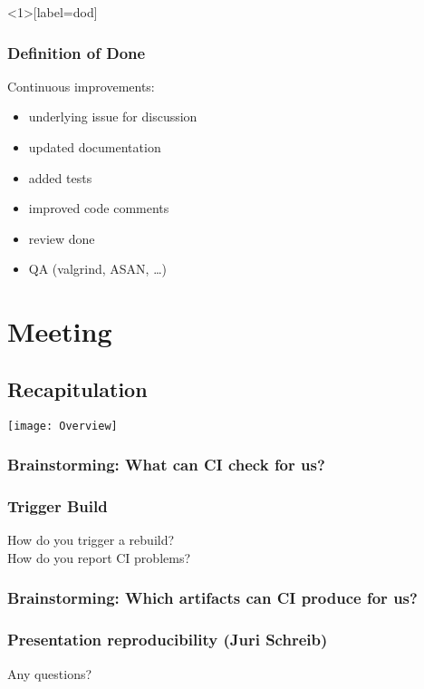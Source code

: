 \begin{frame}<1>[label=dod]
	\frametitle{Definition of Done}

	Continuous improvements:

	\begin{itemize}
	\item underlying issue for discussion
	\item updated documentation
	\item added tests
	\item improved code comments
	\item review done
	\item QA (valgrind, ASAN, \dots)
	\end{itemize}
\end{frame}


\section{Meeting}

\subsection{Recapitulation}

\begin{frame}
	\texttt{[image: Overview]}
\end{frame}


\begin{frame}
	\frametitle{Brainstorming: What can CI check for us?}
\end{frame}

\begin{frame}
	\frametitle{Trigger Build}

	\begin{task}
	How do you trigger a rebuild? \\
	How do you report CI problems?
	\end{task}
\end{frame}


\begin{frame}
	\frametitle{Brainstorming: Which artifacts can CI produce for us?}
\end{frame}

\breakframe

\begin{frame}
	\frametitle{Presentation reproducibility (Juri Schreib)}

	\begin{task}
	Any questions?
	\end{task}
\end{frame}

